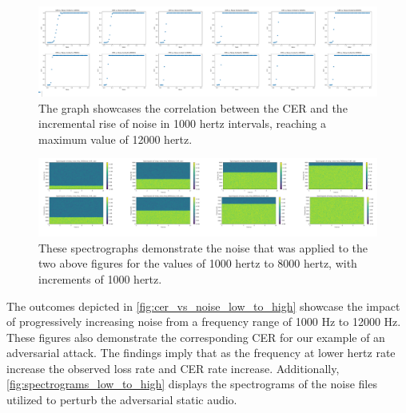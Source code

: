\documentclass[11pt,a4paper]{article}
\begin{document}

\begin{figure}
  \centering
  \includegraphics[width=1.0\textwidth]{images/CER_vs_Noise_bandwidth_low_to_high_HD.png}
  \caption{The graph showcases the correlation between the CER and the incremental rise of noise in 1000 hertz intervals, reaching a maximum value of 12000 hertz.}
  \label{fig:cer_vs_noise_low_to_high}
\end{figure}

\begin{figure}
  \centering
  \includegraphics[width=1.0\textwidth]{images/spectrograms_low_to_high.png}
  \caption{These spectrographs demonstrate the noise that was applied to the two above figures for the values of 1000 hertz to 8000 hertz, with increments of 1000 hertz.}
  \label{fig:spectrograms_low_to_high}
\end{figure}

The outcomes depicted in \autoref{fig:cer_vs_noise_low_to_high} showcase the
impact of progressively increasing noise from a frequency range of 1000 Hz to
12000 Hz. These figures also demonstrate the corresponding CER for our example
of an adversarial attack. The findings imply that as the frequency at lower
hertz rate increase the observed loss rate and CER rate increase. Additionally,
\autoref{fig:spectrograms_low_to_high} displays the spectrograms of the noise
files utilized to perturb the adversarial static audio.
\end{document}
